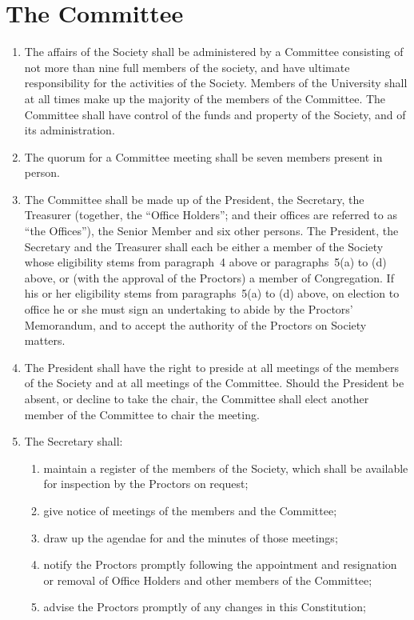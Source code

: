 \documentclass[11pt]{article}
\begin{document}
\section{The Committee}
\begin{enumerate}
\item The affairs of the Society shall be administered by a Committee consisting of not more than nine full members of the society, and have ultimate responsibility for the activities of the Society. Members of the University shall at all times make up the majority of the members of the Committee. The Committee shall have control of the funds and property of the Society, and of its administration.
\item The quorum for a Committee meeting shall be seven members present in person. 
\item The Committee shall be made up of the President, the Secretary, the Treasurer (together, the ``Office Holders''; and their offices are referred to as ``the Offices''), the Senior Member and six other persons. The President, the Secretary and the Treasurer shall each be either a member of the Society whose eligibility stems from paragraph~4 above or paragraphs~5(a) to (d) above, or (with the approval of the Proctors) a member of Congregation. If his or her eligibility stems from paragraphs~5(a) to (d) above, on election to office he or she must sign an undertaking to abide by the Proctors' Memorandum, and to accept the authority of the Proctors on Society matters.
\item The President shall have the right to preside at all meetings of the members of the Society and at all meetings of the Committee. Should the President be absent, or decline to take the chair, the Committee shall elect another member of the Committee to chair the meeting.
\item The Secretary shall:
\begin{enumerate}
\item maintain a register of the members of the Society, which shall be available for inspection by the Proctors on request;
\item give notice of meetings of the members and the Committee;
\item draw up the agendae for and the minutes of those meetings;
\item notify the Proctors promptly following the appointment and resignation or removal of Office Holders and other members of the Committee;
\item advise the Proctors promptly of any changes in this Constitution;

\end{enumerate}
\end{enumerate}
\end{document}
